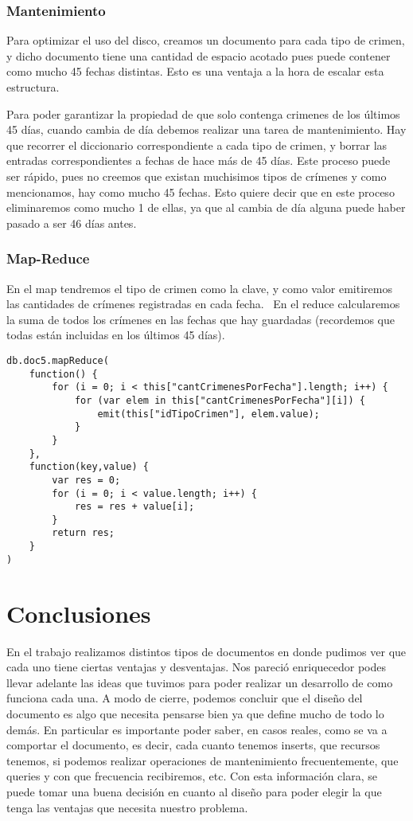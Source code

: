 \documentclass[11pt, a4paper]{article}
\begin{document}
\subsubsection{Mantenimiento}

Para optimizar el uso del disco, creamos un documento para cada tipo de crimen, y dicho documento tiene una cantidad de espacio acotado pues puede contener como mucho 45 fechas distintas. Esto es una ventaja a la hora de escalar esta estructura.\

Para poder garantizar la propiedad de que solo contenga crimenes de los \'ultimos 45 d\'ias, cuando cambia de d\'ia debemos realizar una tarea de mantenimiento. Hay que recorrer el diccionario correspondiente a cada tipo de crimen, y borrar las entradas correspondientes a fechas de hace más de 45 días. Este proceso puede ser r\'apido, pues no creemos que existan muchisimos tipos de cr\'imenes y como mencionamos, hay como mucho 45 fechas. Esto quiere decir que en este proceso eliminaremos como mucho 1 de ellas, ya que al cambia de d\'ia alguna puede haber pasado a ser 46 d\'ias antes.

\subsubsection{Map-Reduce}

En el map tendremos el tipo de crimen como la clave, y como valor emitiremos las cantidades de crímenes registradas en cada fecha. \
En el reduce calcularemos la suma de todos los crímenes en las fechas que hay guardadas (recordemos que todas están incluidas en los últimos 45 días). \
\begin{lstlisting}
db.doc5.mapReduce(
    function() {
    	for (i = 0; i < this["cantCrimenesPorFecha"].length; i++) {
    		for (var elem in this["cantCrimenesPorFecha"][i]) {
				emit(this["idTipoCrimen"], elem.value);
			}
    	}
    },
    function(key,value) {
    	var res = 0;
    	for (i = 0; i < value.length; i++) {
    		res = res + value[i];
    	}
    	return res;
    }
)
\end{lstlisting}


\section{Conclusiones}

En el trabajo realizamos distintos tipos de documentos en donde pudimos ver que cada uno tiene ciertas ventajas y desventajas. Nos pareci\'o enriquecedor podes llevar adelante las ideas que tuvimos para poder realizar un desarrollo de como funciona cada una. A modo de cierre, podemos concluir que el dise\~no del documento es algo que necesita pensarse bien ya que define mucho de todo lo dem\'as. En particular es importante poder saber, en casos reales, como se va a comportar el documento, es decir, cada cuanto tenemos inserts, que recursos tenemos, si podemos realizar operaciones de mantenimiento frecuentemente, que queries y con que frecuencia recibiremos, etc. Con esta informaci\'on clara, se puede tomar una buena decisi\'on en cuanto al dise\~no para poder elegir la que tenga las ventajas que necesita nuestro problema.
\end{document}
